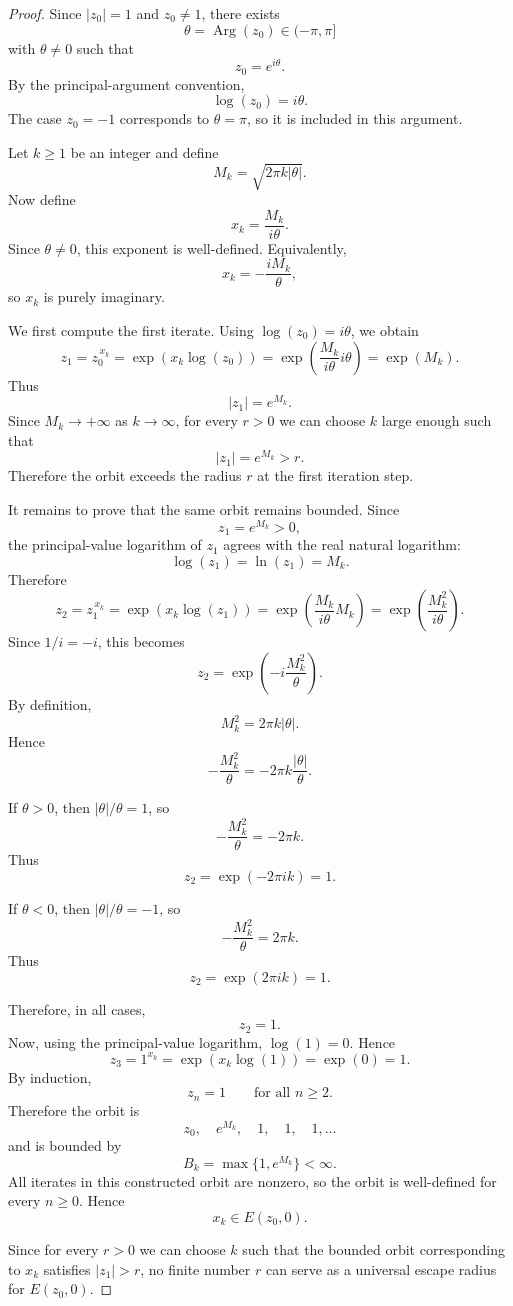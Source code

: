 \documentclass[12pt,a4paper]{amsart}
\theoremstyle{remark}
\begin{document}
\begin{proof}
Since $|z_0|=1$ and $z_0\ne 1$, there exists
\[
\theta=\operatorname{Arg}(z_0)\in(-\pi,\pi]
\]
with $\theta\ne 0$ such that
\[
z_0=e^{i\theta}.
\]
By the principal-argument convention,
\[
\log(z_0)=i\theta.
\]
The case $z_0=-1$ corresponds to $\theta=\pi$, so it is included in this
argument.

Let $k\ge 1$ be an integer and define
\[
M_k=\sqrt{2\pi k|\theta|}.
\]
Now define
\[
x_k=\frac{M_k}{i\theta}.
\]
Since $\theta\ne 0$, this exponent is well-defined. Equivalently,
\[
x_k=-\frac{iM_k}{\theta},
\]
so $x_k$ is purely imaginary.

We first compute the first iterate. Using $\log(z_0)=i\theta$, we obtain
\[
z_1
=
z_0^{\,x_k}
=
\exp(x_k\log(z_0))
=
\exp\left(\frac{M_k}{i\theta}i\theta\right)
=
\exp(M_k).
\]
Thus
\[
|z_1|=e^{M_k}.
\]
Since $M_k\to+\infty$ as $k\to\infty$, for every $r>0$ we can choose $k$
large enough such that
\[
|z_1|=e^{M_k}>r.
\]
Therefore the orbit exceeds the radius $r$ at the first iteration step.

It remains to prove that the same orbit remains bounded. Since
\[
z_1=e^{M_k}>0,
\]
the principal-value logarithm of $z_1$ agrees with the real natural logarithm:
\[
\log(z_1)=\ln(z_1)=M_k.
\]
Therefore
\[
z_2
=
z_1^{\,x_k}
=
\exp(x_k\log(z_1))
=
\exp\left(\frac{M_k}{i\theta}M_k\right)
=
\exp\left(\frac{M_k^2}{i\theta}\right).
\]
Since $1/i=-i$, this becomes
\[
z_2
=
\exp\left(-i\frac{M_k^2}{\theta}\right).
\]
By definition,
\[
M_k^2=2\pi k|\theta|.
\]
Hence
\[
-\frac{M_k^2}{\theta}
=
-2\pi k\frac{|\theta|}{\theta}.
\]

If $\theta>0$, then $|\theta|/\theta=1$, so
\[
-\frac{M_k^2}{\theta}=-2\pi k.
\]
Thus
\[
z_2=\exp(-2\pi i k)=1.
\]

If $\theta<0$, then $|\theta|/\theta=-1$, so
\[
-\frac{M_k^2}{\theta}=2\pi k.
\]
Thus
\[
z_2=\exp(2\pi i k)=1.
\]

Therefore, in all cases,
\[
z_2=1.
\]
Now, using the principal-value logarithm, $\log(1)=0$. Hence
\[
z_3
=
1^{x_k}
=
\exp(x_k\log(1))
=
\exp(0)
=
1.
\]
By induction,
\[
z_n=1
\qquad\text{for all } n\ge 2.
\]
Therefore the orbit is
\[
z_0,\quad e^{M_k},\quad 1,\quad 1,\quad 1,\ldots
\]
and is bounded by
\[
B_k=\max\{1,e^{M_k}\}<\infty.
\]
All iterates in this constructed orbit are nonzero, so the orbit is
well-defined for every $n\ge 0$. Hence
\[
x_k\in E(z_0,0).
\]

Since for every $r>0$ we can choose $k$ such that the bounded orbit
corresponding to $x_k$ satisfies $|z_1|>r$, no finite number $r$ can serve as
a universal escape radius for $E(z_0,0)$.
\end{proof}
\end{document}
